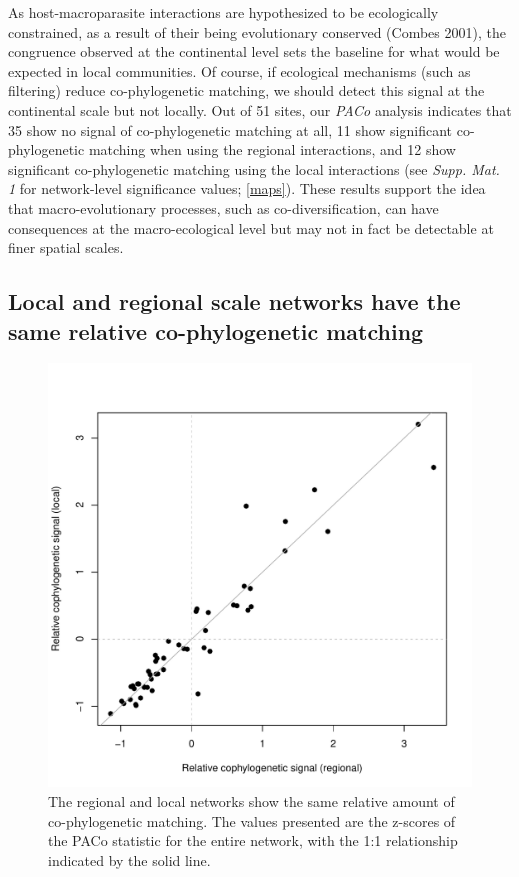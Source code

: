 \documentclass[12pt]{article}
\begin{document}
As host-macroparasite interactions are hypothesized to be ecologically
constrained, as a result of their being evolutionary conserved (Combes
2001), the congruence observed at the continental level sets the
baseline for what would be expected in local communities. Of course, if
ecological mechanisms (such as filtering) reduce co-phylogenetic
matching, we should detect this signal at the continental scale but not
locally. Out of 51 sites, our \emph{PACo} analysis indicates that 35
show no signal of co-phylogenetic matching at all, 11 show significant
co-phylogenetic matching when using the regional interactions, and 12
show significant co-phylogenetic matching using the local interactions
(see \emph{Supp. Mat. 1} for network-level significance values;
\autoref{maps}). These results support the idea that macro-evolutionary
processes, such as co-diversification, can have consequences at the
macro-ecological level but may not in fact be detectable at finer
spatial scales.

\subsection{Local and regional scale networks have the same relative
co-phylogenetic
matching}\label{local-and-regional-scale-networks-have-the-same-relative-co-phylogenetic-matching}

\begin{figure}[htbp]
\centering
\includegraphics[width=1.00000\textwidth]{figures/figureLocReg.pdf}
\caption{The regional and local networks show the same relative amount
of co-phylogenetic matching. The values presented are the z-scores of
the PACo statistic for the entire network, with the 1:1 relationship
indicated by the solid line.\label{fig:relative}}
\end{figure}
\end{document}
